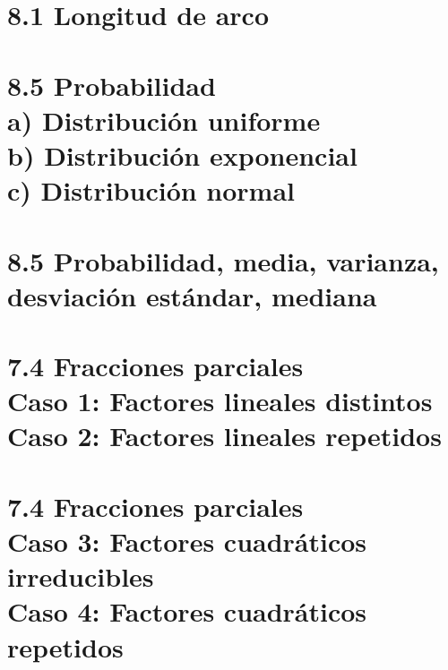 \documentclass{book}
\begin{document}
\chapter{8.1 Longitud de arco }  

\chapter{8.5 Probabilidad \\ a) Distribución uniforme \\ b) Distribución exponencial \\ c) Distribución normal } 

\chapter{8.5 Probabilidad, media, varianza, desviación estándar, mediana } 

\chapter{7.4 Fracciones parciales \\ Caso 1: Factores lineales distintos \\ Caso 2: Factores lineales repetidos } 

\chapter{7.4 Fracciones parciales \\ Caso 3: Factores cuadráticos irreducibles \\ Caso 4: Factores cuadráticos repetidos } 

\chapter{ }

\end{document}
